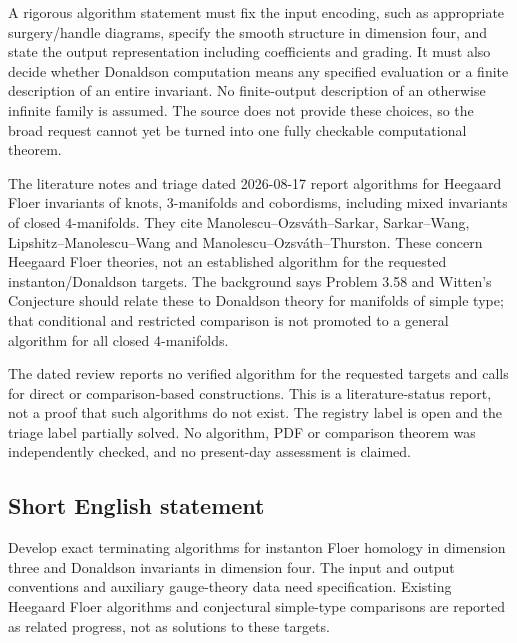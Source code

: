 \documentclass[11pt]{article}
\begin{document}
A rigorous algorithm statement must fix the input encoding, such as appropriate surgery/handle diagrams, specify the smooth structure in dimension four, and state the output representation including coefficients and grading. It must also decide whether Donaldson computation means any specified evaluation or a finite description of an entire invariant. No finite-output description of an otherwise infinite family is assumed. The source does not provide these choices, so the broad request cannot yet be turned into one fully checkable computational theorem.

The literature notes and triage dated 2026-08-17 report algorithms for Heegaard Floer invariants of knots, $3$-manifolds and cobordisms, including mixed invariants of closed $4$-manifolds. They cite Manolescu--Ozsváth--Sarkar, Sarkar--Wang, Lipshitz--Manolescu--Wang and Manolescu--Ozsváth--Thurston. These concern Heegaard Floer theories, not an established algorithm for the requested instanton/Donaldson targets. The background says Problem 3.58 and Witten's Conjecture should relate these to Donaldson theory for manifolds of simple type; that conditional and restricted comparison is not promoted to a general algorithm for all closed $4$-manifolds.

The dated review reports no verified algorithm for the requested targets and calls for direct or comparison-based constructions. This is a literature-status report, not a proof that such algorithms do not exist. The registry label is open and the triage label partially solved. No algorithm, PDF or comparison theorem was independently checked, and no present-day assessment is claimed.
\subsection{Short English statement}
Develop exact terminating algorithms for instanton Floer homology in dimension three and Donaldson invariants in dimension four. The input and output conventions and auxiliary gauge-theory data need specification. Existing Heegaard Floer algorithms and conjectural simple-type comparisons are reported as related progress, not as solutions to these targets.
\end{document}

